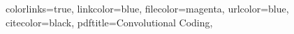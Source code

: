 \hypersetup
{
    colorlinks=true,
    linkcolor=blue,
    filecolor=magenta,      
    urlcolor=blue,
    citecolor=black,
    pdftitle={Convolutional Coding},
}
